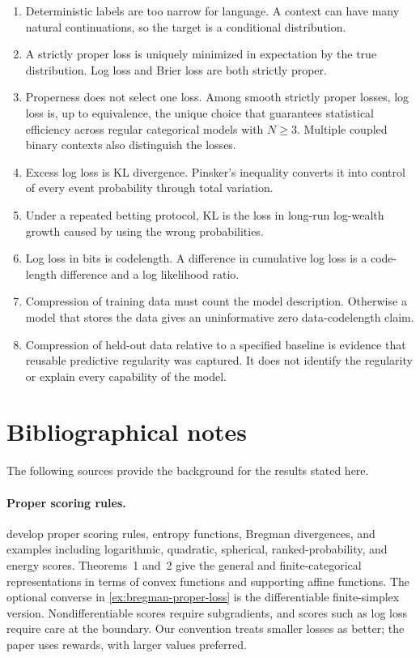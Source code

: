 \documentclass[11pt,twoside]{article}
\theoremstyle{definition}
\theoremstyle{remark}
\begin{document}
\begin{enumerate}[leftmargin=*,itemsep=0.3em,topsep=0.4em]
\item Deterministic labels are too narrow for language. A context can have many
natural continuations, so the target is a conditional distribution.
\item A strictly proper loss is uniquely minimized in expectation by the true
distribution. Log loss and Brier loss are both strictly proper.
\item Properness does not select one loss. Among smooth strictly proper losses,
log loss is, up to equivalence, the unique choice that guarantees statistical
efficiency across regular categorical models with $N\ge3$. Multiple coupled
binary contexts also distinguish the losses.
\item Excess log loss is KL divergence. Pinsker's inequality converts it into
control of every event probability through total variation.
\item Under a repeated betting protocol, KL is the loss in long-run log-wealth
growth caused by using the wrong probabilities.
\item Log loss in bits is codelength. A difference in cumulative log loss is a
code-length difference and a log likelihood ratio.
\item Compression of training data must count the model description. Otherwise
a model that stores the data gives an uninformative zero data-codelength claim.
\item Compression of held-out data relative to a specified baseline is evidence
that reusable predictive regularity was captured. It does not identify the
regularity or explain every capability of the model.
\end{enumerate}

\clearpage
\printendnotes

\section*{Bibliographical notes}
\label{sec:bibliographical-notes}

The following sources provide the background for the results stated here.

\paragraph{Proper scoring rules.}
\citet{gneiting2007} develop proper scoring rules, entropy functions, Bregman divergences, and
examples including logarithmic, quadratic, spherical, ranked-probability, and
energy scores. Theorems~1 and~2 give the general and finite-categorical
representations in terms of convex functions and supporting affine functions.
The optional converse in \cref{ex:bregman-proper-loss} is the differentiable
finite-simplex version. Nondifferentiable scores require subgradients, and
scores such as log loss require care at the boundary. Our convention treats
smaller losses as better; the paper uses rewards, with larger values
preferred.
\end{document}
